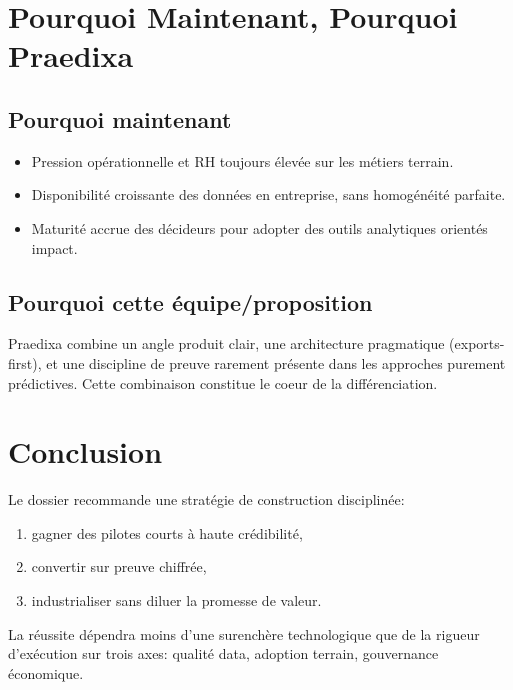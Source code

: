 \documentclass[11pt,a4paper]{article}
\begin{document}
\section{Pourquoi Maintenant, Pourquoi Praedixa}
\subsection{Pourquoi maintenant}
\begin{itemize}
  \item Pression opérationnelle et RH toujours élevée sur les métiers terrain.
  \item Disponibilité croissante des données en entreprise, sans homogénéité parfaite.
  \item Maturité accrue des décideurs pour adopter des outils analytiques orientés impact.
\end{itemize}

\subsection{Pourquoi cette équipe/proposition}
Praedixa combine un angle produit clair, une architecture pragmatique (exports-first), et une discipline de preuve rarement présente dans les approches purement prédictives. Cette combinaison constitue le coeur de la différenciation.

\section{Conclusion}
Le dossier recommande une stratégie de construction disciplinée:
\begin{enumerate}
  \item gagner des pilotes courts à haute crédibilité,
  \item convertir sur preuve chiffrée,
  \item industrialiser sans diluer la promesse de valeur.
\end{enumerate}

La réussite dépendra moins d'une surenchère technologique que de la rigueur d'exécution sur trois axes: qualité data, adoption terrain, gouvernance économique.

\newpage
\appendix
\end{document}
